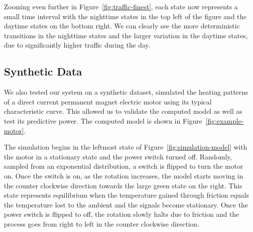 Zooming even further in Figure~\ref{fig:traffic-finest}, each state now represents a small time interval with the nighttime states in the top left of the figure and the daytime states on the bottom right. We can clearly see the more deterministic transitions in the nighttime states  and the larger variation in the daytime states, due to significantly higher traffic during the day.



\subsection{Synthetic Data}
We also tested our system on a synthetic dataset,
simulated the heating patterns of a direct current permanent magnet electric motor \cite{book:1107411} using its typical characteristic curve. %
This allowed us to validate the computed model as well as test its predictive power.  
The computed model is shown in Figure~\ref{fig:example-motor}. 

The simulation begins in the leftmost state of Figure~\ref{fig:simulation-model} with the motor in a stationary state
and the power switch turned off. Randomly, sampled from an exponential distribution, a switch is flipped to turn the motor on. Once the switch is on, as the rotation increases, the model starts moving in the counter clockwise
direction towards the large green state on the right. This state represents equilibrium when the temperature
gained through friction equals the temperature lost to the ambient and the signals become stationary.
Once the power switch is flipped to off, the rotation slowly halts due to friction and the process goes from right to
left in the counter clockwise direction. 

